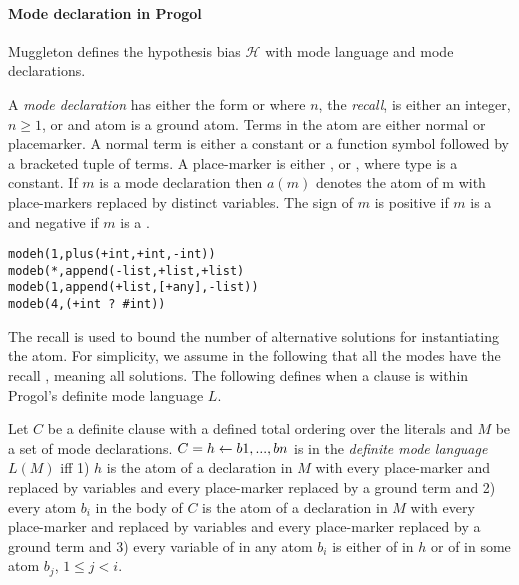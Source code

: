 \paragraph{Mode declaration in Progol}
Muggleton defines the hypothesis bias $\mathcal{H}$ with mode language and mode declarations.
\begin{defn}\cite{muggleton1995inverse}
A \emph{mode declaration} has either the form
 or  where $n$, the \emph{recall}, is either an integer, $n \ge 1$,
or \tc{*} and atom is a ground atom. Terms in the atom are either normal or placemarker. A normal term is either a constant or a function symbol followed by a
bracketed tuple of terms. A place-marker is either ,  or , where
type is a constant. If $m$ is a mode declaration then $a(m)$ denotes the atom of m
with place-markers replaced by distinct variables. The sign of $m$ is positive if $m$
is a  and negative if $m$ is a .
\end{defn}

\begin{exmp}\cite{muggleton1995inverse}
\begin{lstlisting}
modeh(1,plus(+int,+int,-int))
modeb(*,append(-list,+list,+list)
modeb(1,append(+list,[+any],-list))
modeb(4,(+int ? #int))
\end{lstlisting}
\end{exmp}

\begin{remark}\cite{muggleton1995inverse}
The recall is used to bound the number of alternative solutions for instantiating
the atom. For simplicity, we assume in the following that all the modes have the
recall \tc{*}, meaning all solutions. The following defines when a clause is within Progol's definite mode language $L$.
\end{remark}

\begin{defn}\cite{muggleton1995inverse}
Let $C$ be a definite clause with a
defined total ordering over the literals and $M$ be a set of mode declarations.
$C = h \leftarrow b1, ..., bn$ is in the \emph{definite mode language} $L(M)$ iff 1) $h$ is the atom
of a  declaration in $M$ with every place-marker  and  replaced by
variables and every place-marker  replaced by a ground term and 2) every
atom $b_i$ in the body of $C$ is the atom of a  declaration in $M$ with every
place-marker  and  replaced by variables and every place-marker 
replaced by a ground term and 3) every variable of  in any atom $b_i$ is either
of  in $h$ or of  in some atom $b_j$, $1 \le j < i$.
\end{defn}


